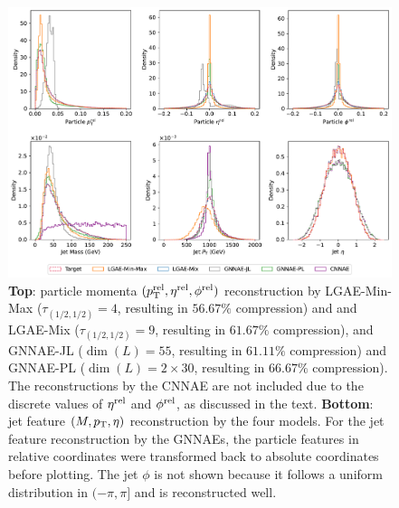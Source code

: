 \begin{figure}[ht!]
    \centering
    \includegraphics[width=\linewidth]{figures/06-ML4Jets/lgae/reconstructions/hist-cnnae.pdf}
    \caption[Particle and jet feature reconstruction by the LGAE, GNNAE, and CNNAE models.]{
        \textbf{Top}:
        particle momenta $(p_{\mathrm{T}}^{\mathrm{rel}}, \eta^{\mathrm{rel}}, \phi^{\mathrm{rel}})$ reconstruction by
        LGAE-Min-Max ($\tau_{(1/2, 1/2)}=4$, resulting in $56.67\%$ compression) and
        and LGAE-Mix ($\tau_{(1/2, 1/2)}=9$, resulting in $61.67\%$ compression),
        and GNNAE-JL ($\dim(L) = 55$, resulting in $61.11\%$ compression) and
        GNNAE-PL ($\dim(L) = 2\times 30$, resulting in $66.67\%$ compression). The reconstructions by the CNNAE are not included due to the discrete values of $\eta^{\mathrm{rel}}$ and $\phi^{\mathrm{rel}}$, as discussed in the text.
        \textbf{Bottom}:
        jet feature $(M, p_{\mathrm{T}}, \eta)$ reconstruction by the four models.
        For the jet feature reconstruction by the GNNAEs, the particle features in relative coordinates were transformed back to absolute coordinates before plotting.
        The jet $\phi$ is not shown because it follows a uniform distribution in $(-\pi, \pi]$ and is reconstructed well.
    }
    \label{fig:06_lgae_recons-hist}
\end{figure}

